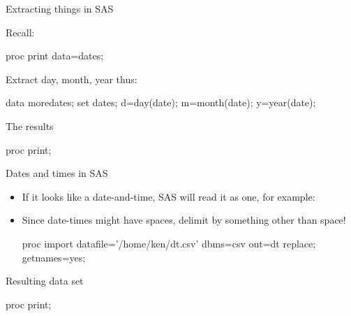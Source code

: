 \documentclass[unknownkeysallowed]{beamer}\usepackage[]{graphicx}\usepackage[]{color}
\begin{document}
\begin{frame}[fragile]{Extracting things in SAS}
  
Recall:

\begin{Sascode}[store=dm]
proc print data=dates;
\end{Sascode}



Extract day, month, year thus:

\begin{Datastep}
data moredates;
  set dates;
  d=day(date);
  m=month(date);
  y=year(date);
\end{Datastep}


\end{frame}

\begin{frame}[fragile]{The results}

\begin{Sascode}[store=dn]
proc print;  
\end{Sascode}


  
  
\end{frame}

\begin{frame}[fragile]{Dates and times in SAS}

  \begin{itemize}
    
\item If it looks like a date-and-time, SAS will read it as one, for example:
  
  
  
\item Since date-times might have spaces, delimit by something other
  than space!

\begin{Datastep}
proc import
  datafile='/home/ken/dt.csv'
    dbms=csv
    out=dt
    replace;
  getnames=yes;
\end{Datastep}
    

  

\end{itemize}
  
\end{frame}

\begin{frame}[fragile]{Resulting data set}

\begin{Sascode}[store=do]
proc print;  
\end{Sascode}
  
  
\end{frame}
\end{document}
